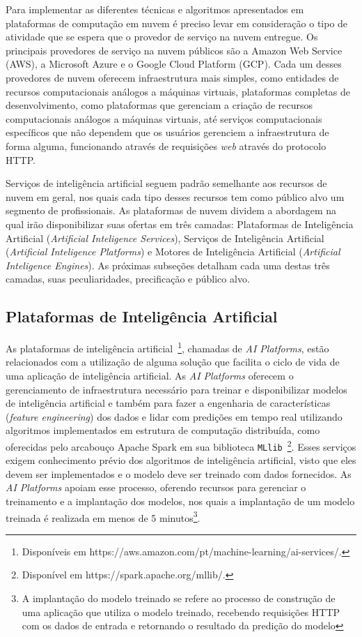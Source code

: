\documentclass{SBCbookchapter}
\begin{document}
Para implementar as diferentes técnicas e algoritmos apresentados em plataformas de computação em nuvem é preciso levar em consideração o tipo de atividade que se espera que o provedor de serviço na nuvem entregue. Os principais provedores de serviço na nuvem públicos são a Amazon Web Service (AWS), a Microsoft Azure e o Google Cloud Platform (GCP). Cada um desses provedores de nuvem oferecem infraestrutura mais simples, como entidades de recursos computacionais análogos a máquinas virtuais, plataformas completas de desenvolvimento, como plataformas que gerenciam a criação de recursos computacionais análogos a máquinas virtuais, até serviços computacionais específicos que não dependem que os usuários gerenciem a infraestrutura de forma alguma, funcionando através de requisições \textit{web} através do protocolo HTTP.

Serviços de inteligência artificial seguem padrão semelhante aos recursos de nuvem em geral, nos quais cada tipo desses recursos tem como público alvo um segmento de profissionais. As plataformas de nuvem dividem a abordagem na qual irão disponibilizar suas ofertas em três camadas: Plataformas de Inteligência Artificial (\textit{Artificial Inteligence Services}), Serviços de Inteligência Artificial (\textit{Artificial Inteligence Platforms}) e Motores de Inteligência Artificial (\textit{Artificial Inteligence Engines}). As próximas subseções detalham  cada uma destas três camadas, suas peculiaridades, precificação e público alvo.


\subsection{Plataformas de Inteligência Artificial}

As plataformas de inteligência artificial~\footnote{Disponíveis em https://aws.amazon.com/pt/machine-learning/ai-services/.}, chamadas de \textit{AI Platforms}, estão relacionados com a utilização de alguma solução que facilita o ciclo de vida de uma aplicação de inteligência artificial. As \textit{AI Platforms} oferecem o gerenciamento de infraestrutura necessário para treinar e disponibilizar modelos de inteligência artificial e também para fazer a engenharia de características (\textit{feature engineering}) dos dados e lidar com predições em tempo real utilizando algoritmos implementados em estrutura de computação distribuída, como oferecidas pelo arcabouço Apache Spark em sua biblioteca \texttt{MLlib}~\footnote{Disponível em https://spark.apache.org/mllib/.}. Esses serviços exigem conhecimento prévio dos algoritmos de inteligência artificial, visto que eles devem ser implementados e o modelo deve ser treinado com dados fornecidos. As \textit{AI Platforms} apoiam esse processo, oferendo recursos para gerenciar o treinamento e a implantação dos modelos, nos quais a implantação de um modelo treinada é realizada em menos de 5 minutos\footnote{A implantação do modelo treinado se refere ao processo de construção de uma aplicação que utiliza o modelo treinado, recebendo requisições HTTP com os dados de entrada e retornando o resultado da predição do modelo}.
\end{document}
